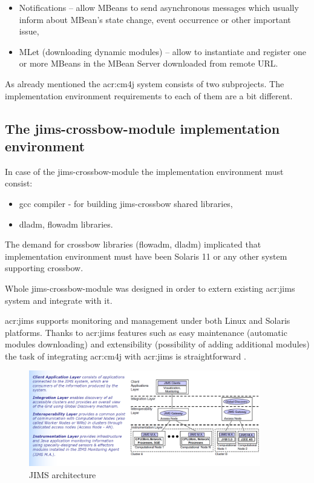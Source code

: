 \documentclass[11pt,openany]{book}
\begin{document}
      \begin{itemize}
        \item Notifications  -- allow MBeans to send asynchronous messages which usually inform about MBean's state change, event occurrence or other important issue,
        \item MLet (downloading dynamic modules) -- allow to instantiate and register one or more MBeans in the MBean Server downloaded from remote URL.
      \end{itemize}
	
      As already mentioned the \gls{acr:cm4j} system consists of two subprojects. The implementation environment
     requirements to each of them are a bit different. 
	
      \subsection{The jims-crossbow-module implementation environment}

      In case of the jims-crossbow-module the implementation environment must consist:

      \begin{itemize}
        \item gcc compiler - for building jims-crossbow shared libraries,
        \item dladm, flowadm libraries.
      \end{itemize}
	
      The demand for crossbow libraries (flowadm, dladm) implicated that implementation environment must have been
      Solaris 11 or any other system supporting crossbow.

     Whole jims-crossbow-module was designed in order to extern existing \gls{acr:jims} system and integrate with it.

      \gls{acr:jims} supports monitoring and management under both Linux and Solaris platforms. Thanks to \gls{acr:jims}
      features such as easy maintenance (automatic modules downloading) and extensibility (possibility of adding
      additional modules) the task of integrating \gls{acr:cm4j} with \gls{acr:jims} is straightforward \cite{jims}.
    
      \begin{figure}[H]
        \begin{center}
          \includegraphics[width=0.9\textwidth]{img/jims/jims.png}
        \end{center}
        \caption{JIMS architecture \cite{jims}}
      \end{figure}
\end{document}

